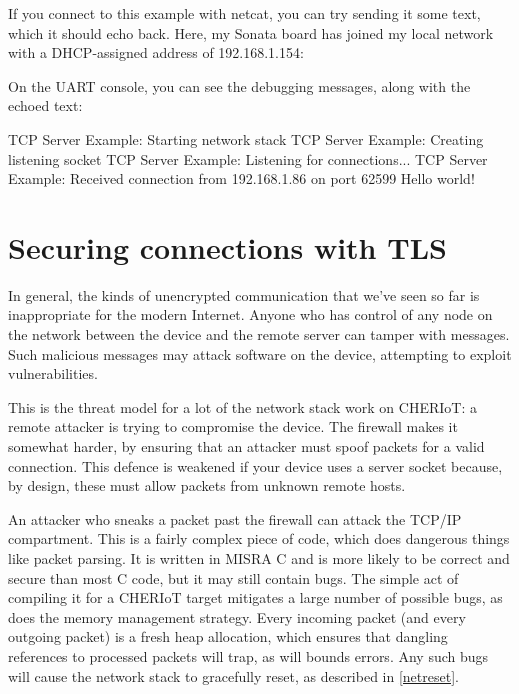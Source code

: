 If you connect to this example with netcat, you can try sending it some text, which it should echo back.
Here, my Sonata board has joined my local network with a DHCP-assigned address of 192.168.1.154:


On the UART console, you can see the debugging messages, along with the echoed text:

\begin{console}
TCP Server Example: Starting network stack
TCP Server Example: Creating listening socket
TCP Server Example: Listening for connections...
TCP Server Example: Received connection from 192.168.1.86 on port 62599
Hello world!
\end{console}


\section{Securing connections with TLS}

In general, the kinds of unencrypted communication that we've seen so far is inappropriate for the modern Internet.
Anyone who has control of any node on the network between the device and the remote server can tamper with messages.
Such malicious messages may attack software on the device, attempting to exploit vulnerabilities.

This is the threat model for a lot of the network stack work on CHERIoT: a remote attacker is trying to compromise the device.
The firewall makes it somewhat harder, by ensuring that an attacker must spoof packets for a valid connection.
This defence is weakened if your device uses a server socket because, by design, these must allow packets from unknown remote hosts.

An attacker who sneaks a packet past the firewall can attack the TCP/IP compartment.
This is a fairly complex piece of code, which does dangerous things like packet parsing.
It is written in MISRA C and is more likely to be correct and secure than most C code, but it may still contain bugs.
The simple act of compiling it for a CHERIoT target mitigates a large number of possible bugs, as does the memory management strategy.
Every incoming packet (and every outgoing packet) is a fresh heap allocation, which ensures that dangling references to processed packets will trap, as will bounds errors.
Any such bugs will cause the network stack to gracefully reset, as described in \ref{netreset}.

